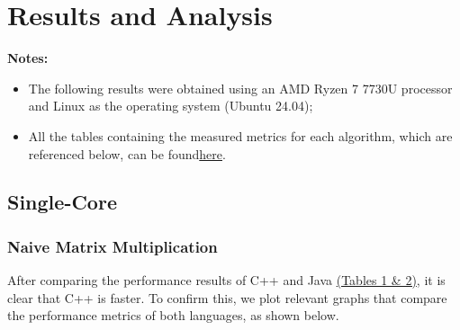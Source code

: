 \documentclass{article}
\begin{document}
\section{Results and Analysis}

\textbf{Notes:} 

\begin{itemize}
    \item The following results were obtained using an AMD Ryzen 7 7730U processor and Linux as the operating system (Ubuntu 24.04);
    
    \item All the tables containing the measured metrics for each algorithm, which are referenced below, can be found\href{https://docs.google.com/document/d/1E8KPoQWMwUetj-bHXUUAothTzyv35YMWbAajiGcYC3A/edit?usp=sharing}{here}.
\end{itemize}

\subsection{Single-Core}

\subsubsection{Naive Matrix Multiplication}

After comparing the performance results of C++ and Java \href{https://docs.google.com/document/d/1E8KPoQWMwUetj-bHXUUAothTzyv35YMWbAajiGcYC3A/edit?usp=sharing}{(Tables 1 \& 2)}, it is clear that C++ is faster. To confirm this, we plot relevant graphs that compare the performance metrics of both languages, as shown below.
\end{document}
